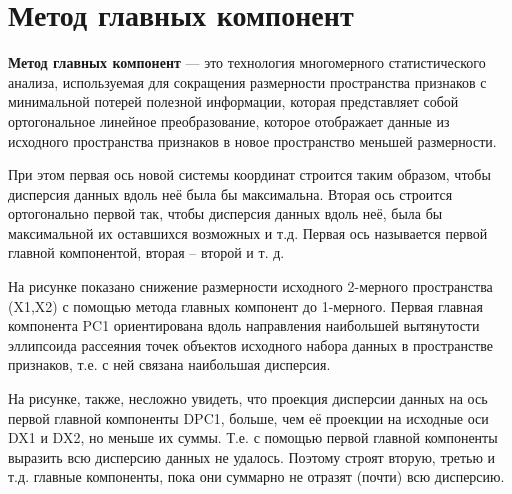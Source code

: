 \documentclass[a4paper, 12pt]{article}
\begin{document}
\section{Метод главных компонент}

\textbf{Метод главных компонент} --- это технология многомерного статистического анализа, используемая для сокращения размерности пространства признаков с минимальной потерей полезной информации, которая представляет собой ортогональное линейное преобразование, которое отображает данные из исходного пространства признаков в новое пространство меньшей размерности.

При этом первая ось новой системы координат строится таким образом, чтобы дисперсия данных вдоль неё была бы максимальна. Вторая ось строится ортогонально первой так, чтобы дисперсия данных вдоль неё, была бы максимальной их оставшихся возможных и т.д. Первая ось называется первой главной компонентой, вторая -- второй и т. д.
 
\begin{figure}[h!]
    \label{ris:image}
    \end{figure}

На рисунке показано снижение размерности исходного 2-мерного пространства (X1,X2) с помощью метода главных компонент до 1-мерного. Первая главная компонента PC1 ориентирована вдоль направления наибольшей вытянутости эллипсоида рассеяния точек объектов исходного набора данных в пространстве признаков, т.е. с ней связана наибольшая дисперсия.

На рисунке, также, несложно увидеть, что проекция дисперсии данных на ось первой главной компоненты DPC1, больше, чем её проекции на исходные оси DX1 и DX2, но меньше их суммы. Т.е. с помощью первой главной компоненты выразить всю дисперсию данных не удалось. Поэтому строят вторую, третью и т.д. главные компоненты, пока они суммарно не отразят (почти) всю дисперсию.
\end{document}
